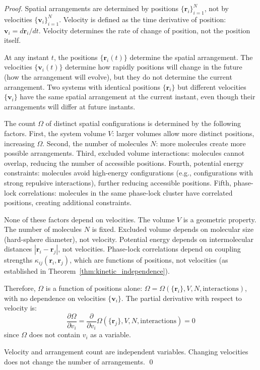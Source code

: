 \documentclass[12pt,a4paper]{article}
\theoremstyle{definition}
\theoremstyle{remark}
\begin{document}
\begin{proof}
Spatial arrangements are determined by positions $\{\mathbf{r}_i\}_{i=1}^N$, not by velocities $\{\mathbf{v}_i\}_{i=1}^N$. Velocity is defined as the time derivative of position: $\mathbf{v}_i = d\mathbf{r}_i / dt$. Velocity determines the rate of change of position, not the position itself.

At any instant $t$, the positions $\{\mathbf{r}_i(t)\}$ determine the spatial arrangement. The velocities $\{\mathbf{v}_i(t)\}$ determine how rapidly positions will change in the future (how the arrangement will evolve), but they do not determine the current arrangement. Two systems with identical positions $\{\mathbf{r}_i\}$ but different velocities $\{\mathbf{v}_i\}$ have the same spatial arrangement at the current instant, even though their arrangements will differ at future instants.

The count $\Omega$ of distinct spatial configurations is determined by the following factors. First, the system volume $V$: larger volumes allow more distinct positions, increasing $\Omega$. Second, the number of molecules $N$: more molecules create more possible arrangements. Third, excluded volume interactions: molecules cannot overlap, reducing the number of accessible positions. Fourth, potential energy constraints: molecules avoid high-energy configurations (e.g., configurations with strong repulsive interactions), further reducing accessible positions. Fifth, phase-lock correlations: molecules in the same phase-lock cluster have correlated positions, creating additional constraints.

None of these factors depend on velocities. The volume $V$ is a geometric property. The number of molecules $N$ is fixed. Excluded volume depends on molecular size (hard-sphere diameter), not velocity. Potential energy depends on intermolecular distances $|\mathbf{r}_i - \mathbf{r}_j|$, not velocities. Phase-lock correlations depend on coupling strengths $\kappa_{ij}(\mathbf{r}_i, \mathbf{r}_j)$, which are functions of positions, not velocities (as established in Theorem~\ref{thm:kinetic_independence}).

Therefore, $\Omega$ is a function of positions alone: $\Omega = \Omega(\{\mathbf{r}_i\}, V, N, \text{interactions})$, with no dependence on velocities $\{\mathbf{v}_i\}$. The partial derivative with respect to velocity is:
\begin{equation}
\frac{\partial \Omega}{\partial v_i} = \frac{\partial}{\partial v_i} \Omega(\{\mathbf{r}_j\}, V, N, \text{interactions}) = 0
\end{equation}
since $\Omega$ does not contain $v_i$ as a variable.

Velocity and arrangement count are independent variables. Changing velocities does not change the number of arrangements. \qed
\end{proof}
\end{document}
